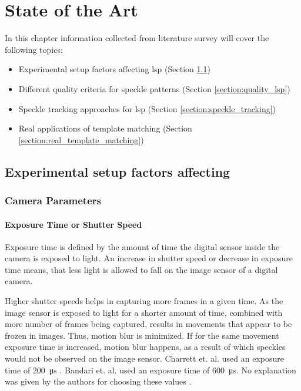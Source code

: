 \chapter{State of the Art}\label{chapter:sota}
In this chapter information collected from literature survey will cover the following topics:

\begin{itemize}
    \item Experimental setup factors affecting \gls{lsp} (Section \ref{section:exp_factors})
    \item Different quality criteria for speckle patterns (Section \ref{section:quality_lsp})
    \item Speckle tracking approaches for \gls{lsp} (Section \ref{section:speckle_tracking})
    \item Real applications of template matching (Section \ref{section:real_template_matching})
\end{itemize}

\section{Experimental setup factors affecting }\label{section:exp_factors}

\subsection{Camera Parameters}

    \subsubsection{Exposure Time or Shutter Speed}\label{subsubsection:Exposure_Time}
    Exposure time is defined by the amount of time the digital sensor inside the camera is exposed to light. An increase in shutter speed or decrease in exposure time means, that less light is allowed to fall on the image sensor of a digital camera.

    \vspace{5mm}
    \noindent Higher shutter speeds helps in capturing more frames in a given time. As the image sensor is exposed to light for a shorter amount of time, combined with more number of frames being captured, results in movements that appear to be frozen in images. Thus, motion blur is minimized. If for the same movement exposure time is increased, motion blur happens, as a result of which speckles would not be observed on the image sensor. Charrett et. al.  used an exposure time of \SI{200}{\micro\second} \cite{charrett_2018}. Bandari et. al. used an exposure time of \SI{600}{\micro\second}. No explanation was given by the authors for choosing these values \cite{bandari}.

